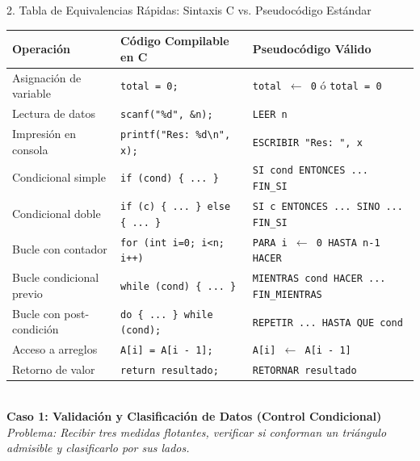 \documentclass[11pt,letterpaper]{article}
\begin{document}
\begin{conceptbox}{2. Tabla de Equivalencias Rápidas: Sintaxis C vs. Pseudocódigo Estándar}
\centering
\footnotesize
\begin{tabular}{p{4.2cm} p{5.5cm} p{5.5cm}}
\toprule
\textbf{Operación} & \textbf{Código Compilable en C} & \textbf{Pseudocódigo Válido} \\
\midrule
Asignación de variable & \texttt{total = 0;} & \texttt{total $\leftarrow$ 0} \quad ó \quad \texttt{total = 0} \\
Lectura de datos & \texttt{scanf("\%d", \&n);} & \texttt{LEER n} \\
Impresión en consola & \texttt{printf("Res: \%d\textbackslash n", x);} & \texttt{ESCRIBIR "Res: ", x} \\
Condicional simple & \texttt{if (cond) \{ ... \}} & \texttt{SI cond ENTONCES ... FIN\_SI} \\
Condicional doble & \texttt{if (c) \{ ... \} else \{ ... \}} & \texttt{SI c ENTONCES ... SINO ... FIN\_SI} \\
Bucle con contador & \texttt{for (int i=0; i<n; i++)} & \texttt{PARA i $\leftarrow$ 0 HASTA n-1 HACER} \\
Bucle condicional previo & \texttt{while (cond) \{ ... \}} & \texttt{MIENTRAS cond HACER ... FIN\_MIENTRAS} \\
Bucle con post-condición & \texttt{do \{ ... \} while (cond);} & \texttt{REPETIR ... HASTA QUE cond} \\
Acceso a arreglos & \texttt{A[i] = A[i - 1];} & \texttt{A[i] $\leftarrow$ A[i - 1]} \\
Retorno de valor & \texttt{return resultado;} & \texttt{RETORNAR resultado} \\
\bottomrule
\end{tabular}
\end{conceptbox}

\newpage
{} \\[0.2cm]

\noindent \textbf{Caso 1: Validación y Clasificación de Datos (Control Condicional)} \\
\small \textit{Problema: Recibir tres medidas flotantes, verificar si conforman un triángulo admisible y clasificarlo por sus lados.}
\vspace{0.2cm}
\end{document}
